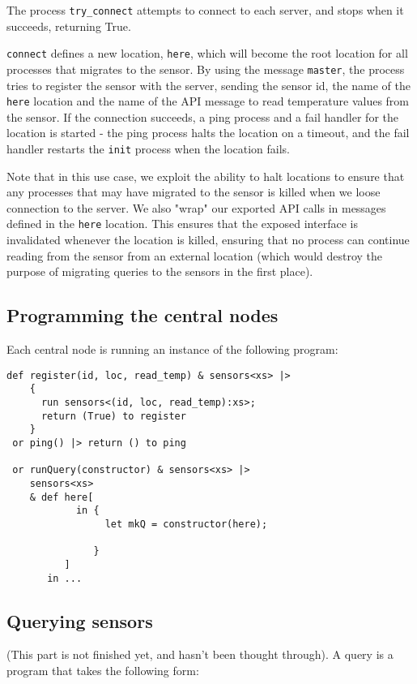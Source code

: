 The process \verb!try_connect! attempts to connect to each server,
and stops when it succeeds, returning True.

\verb!connect! defines a new location, \verb!here!, which will
become the root location for all processes that migrates to the
sensor. By using the message \verb!master!, the process tries to
register the sensor with the server, sending the sensor id, the
name of the \verb!here! location and the name of the API message to
read temperature values from the sensor. If the connection
succeeds, a ping process and a fail handler for the location is
started - the ping process halts the location on a timeout, and the
fail handler restarts the \verb!init! process when the location
fails.

Note that in this use case, we exploit the ability to halt
locations to ensure that any processes that may have migrated to
the sensor is killed when we loose connection to the server. We
also "wrap" our exported API calls in messages defined in the
\verb!here! location. This ensures that the exposed interface is
invalidated whenever the location is killed, ensuring that no
process can continue reading from the sensor from an external
location (which would destroy the purpose of migrating queries to
the sensors in the first place).

\subsection{Programming the central nodes}

Each central node is running an instance of the following program:

\begin{verbatim}
def register(id, loc, read_temp) & sensors<xs> |>
    {
      run sensors<(id, loc, read_temp):xs>;
      return (True) to register
    }
 or ping() |> return () to ping

 or runQuery(constructor) & sensors<xs> |>
    sensors<xs>
    & def here[
            in {
                 let mkQ = constructor(here);

               }
          ]
       in ...
\end{verbatim}


\subsection{Querying sensors}

(This part is not finished yet, and hasn't been thought through). A
query is a program that takes the following form:

